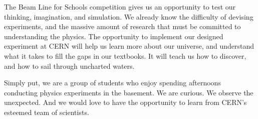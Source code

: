 \documentclass[12pt,letterpaper]{article}
\begin{document}
The Beam Line for Schools competition gives us an opportunity to test our thinking, imagination, and simulation. We already know the difficulty of devising experiments, and the massive amount of research that must be committed to understanding the physics. The opportunity to implement our designed experiment at CERN will help us learn more about our universe, and understand what it takes to fill the gaps in our textbooks.
It will teach us how to discover, and how to sail through uncharted waters.

Simply put, we are a group of students who enjoy spending afternoons conducting physics experiments in the basement. We are curious. We observe the unexpected. And we would love to have the opportunity to learn from CERN’s esteemed team of scientists.
\end{document}
